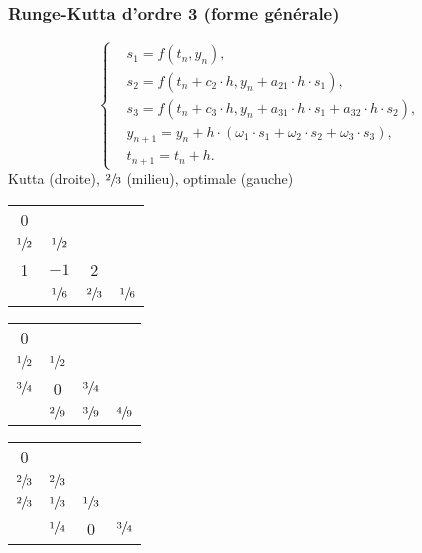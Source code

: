 \subsubsection*{Runge-Kutta d'ordre 3 (forme générale)}
\noindent
\begin{equation}
    \left\{
    \begin{aligned}
         & s_1     = f(t_n,y_n),                                                                     \\
         & s_2     = f\left(t_n+c_2\cdot h,y_n+a_{21}\cdot h\cdot s_1\right),                        \\
         & s_3     = f\left(t_n+c_3\cdot h,y_n+a_{31}\cdot h\cdot s_1+a_{32}\cdot h\cdot s_2\right), \\
         & y_{n+1} = y_n+h\cdot (\omega_1\cdot s_1 + \omega_2\cdot s_2 + \omega_3\cdot s_3),         \\
         & t_{n+1} = t_n+h.
    \end{aligned}
    \right.
    \nonumber
\end{equation}
Kutta (droite), $\sfrac{2}{3}$ (milieu), optimale (gauche)
\begin{center}
    \begin{tabular}{c|c c c}
        0              &                &                &                \\
        $\sfrac{1}{2}$ & $\sfrac{1}{2}$ &                &                \\
        1              & $-1$           & 2              &                \\
        \hline
                       & $\sfrac{1}{6}$ & $\sfrac{2}{3}$ & $\sfrac{1}{6}$
    \end{tabular}
    \begin{tabular}{c|c c c}
        0              &                &                &                \\
        $\sfrac{1}{2}$ & $\sfrac{1}{2}$ &                &                \\
        $\sfrac{3}{4}$ & 0              & $\sfrac{3}{4}$ &                \\
        \hline
                       & $\sfrac{2}{9}$ & $\sfrac{3}{9}$ & $\sfrac{4}{9}$
    \end{tabular}
    \begin{tabular}{c|c c c}
        0              &                &                &                \\
        $\sfrac{2}{3}$ & $\sfrac{2}{3}$ &                &                \\
        $\sfrac{2}{3}$ & $\sfrac{1}{3}$ & $\sfrac{1}{3}$ &                \\
        \hline
                       & $\sfrac{1}{4}$ & 0              & $\sfrac{3}{4}$
    \end{tabular}
\end{center}
